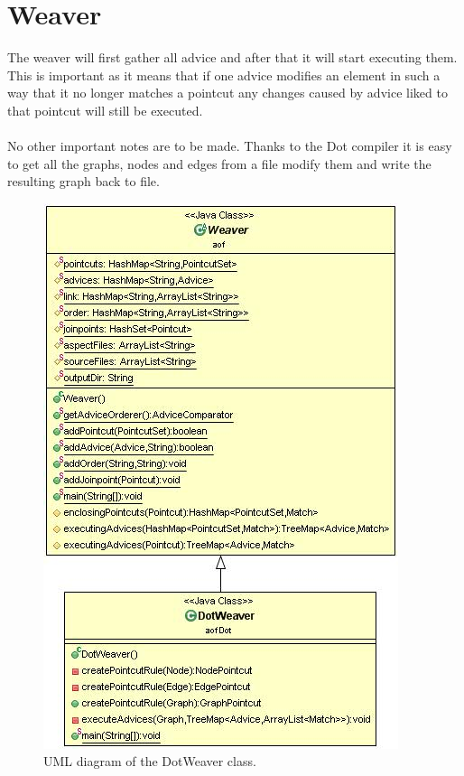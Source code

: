 \documentclass[a4paper]{report}
\begin{document}
\section{Weaver}
The weaver will first gather all advice and after that it will start executing them. This is important as it means that if one advice modifies an element in such a way that it no longer matches a pointcut any changes caused by advice liked to that pointcut will still be executed.\\
\\
No other important notes are to be made. Thanks to the Dot compiler it is easy to get all the graphs, nodes and edges from a file modify them and write the resulting graph back to file.\\
\begin{figure}
\centering
\includegraphics[scale=0.7]{images/AOFDot/DotWeaver.jpg}
\caption{UML diagram of the DotWeaver class.}
\label{fig:DotWeaver}
\end{figure}
\end{document}
